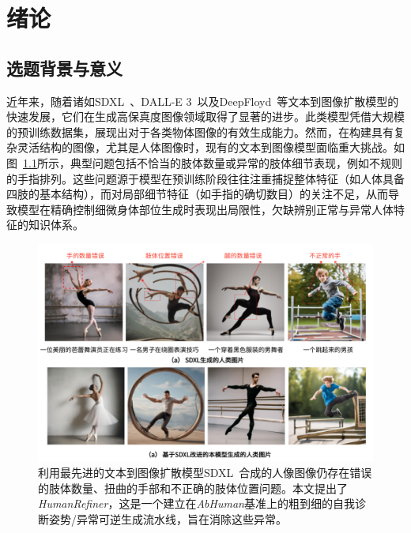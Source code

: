 
\chapter{绪论}
\section{选题背景与意义}
\label{sec:background}
\label{sec:intro}

近年来，随着诸如SDXL~\cite{SDXL}、DALL-E 3~\cite{DALLE_2}以及DeepFloyd~\cite{SDXL, DALLE_2, shonenkov2023deepfloyd}等文本到图像扩散模型的快速发展，它们在生成高保真度图像领域取得了显著的进步。此类模型凭借大规模的预训练数据集，展现出对于各类物体图像的有效生成能力。然而，在构建具有复杂灵活结构的图像，尤其是人体图像时，现有的文本到图像模型面临重大挑战。如图~\ref{fig:intro}所示，典型问题包括不恰当的肢体数量或异常的肢体细节表现，例如不规则的手指排列。这些问题源于模型在预训练阶段往往注重捕捉整体特征（如人体具备四肢的基本结构），而对局部细节特征（如手指的确切数目）的关注不足，从而导致模型在精确控制细微身体部位生成时表现出局限性，欠缺辨别正常与异常人体特征的知识体系。

\begin{figure}[h]
    \centering
    \includegraphics[width=1\textwidth]{fig/intro.pdf}
    \caption{利用最先进的文本到图像扩散模型SDXL~\cite{SDXL}合成的人像图像仍存在错误的肢体数量、扭曲的手部和不正确的肢体位置问题。本文提出了\textit{HumanRefiner}，这是一个建立在\textit{AbHuman}基准上的粗到细的自我诊断姿势/异常可逆生成流水线，旨在消除这些异常。}
    \label{fig:intro}
\end{figure}



